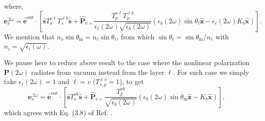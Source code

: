 \documentclass[10pt]{article}
\begin{document}
where,
\begin{equation}\label{r12}
\mathbf{e}^{\,2\omega}_{\ell} = \hat{\mathbf{e}}^{\mathrm{out}}\cdot
\left[
\hat{\mathbf{s}}T_{s}^{v\ell}T_{s}^{\ell b}\hat{\mathbf{s}}
+ \hat{\mathbf{P}}_{v+}
\frac{T^{v\ell}_{p}T^{\ell b}_{p}}
     {\epsilon_{\ell}({2\omega})\sqrt{\epsilon_{b}(2\omega)}}
\left(
  \epsilon_{b}(2\omega)\sin\theta_{\ell}\hat{\mathbf{z}}
- \epsilon_{\ell}(2\omega)K_{b}\hat{\mathbf{x}}
\right)
\right]
.  
\end{equation}  
We mention that $n_v\sin\theta_{\mathrm{in}}=n_{\ell}\sin\theta_{\ell}$, from
which $\sin\theta_{\ell}=\sin\theta_{\mathrm{in}}/n_{\ell}$ with
$n_i=\sqrt{\epsilon_i(\omega)}$.

We pause here to reduce above result to the case where the nonlinear
polarization $\mathbf{P}(2\omega)$ radiates from vacuum instead from the layer
$\ell$. For such case we simply take $\epsilon_{\ell}(2\omega)=1$ and $\ell=v$
($T^{\ell v}_{s,p}=1$), to get
\begin{equation}\label{r13}
\mathbf{e}^{\,2\omega}_{v} = \hat{\mathbf{e}}^{\mathrm{out}}
\cdot\left[
\hat{\mathbf{s}}T_s^{v b}\hat{\mathbf{s}} + \hat{\mathbf{P}}_{v+}
\frac{T^{v b}_{p}}{\sqrt{\epsilon_{b}(2\omega)}}
\left(
  \epsilon_{b}(2\omega)\sin\theta_{\mathrm{in}}\hat{\mathbf{z}}
  - K_{b}\hat{\mathbf{x}}
\right) 
\right] 
,
\end{equation}
which agrees with Eq. (3.8) of Ref. \cite{mizrahiJOSA88}.
\end{document}
